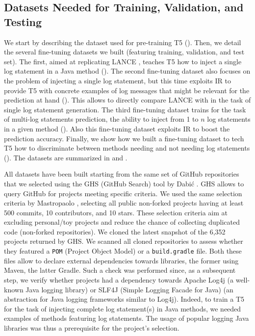 \subsection{Datasets Needed for Training, Validation, and Testing}
\label{sub:datasets}

We start by describing the dataset used for pre-training T5 (). Then, we detail the several fine-tuning datasets we built (featuring training, validation, and test set). The first, aimed at replicating LANCE \cite{mastropaolo2022using}, teaches T5 how to inject a single log statement in a Java method  (). The second fine-tuning dataset also focuses on the problem of injecting a single log statement, but this time exploits IR to provide T5 with concrete examples of log messages that might be relevant for the prediction at hand (). This allows to directly compare LANCE with \approach in the task of single log statement generation. The third fine-tuning dataset trains \approach for the task of multi-log statements prediction, \ie the ability to inject from 1 to $n$ log statements in a given method (). Also this fine-tuning dataset exploits IR to boost the prediction accuracy. Finally, we show how we built a fine-tuning dataset to tech T5 how to discriminate between methods needing and not needing log statements (). The datasets are summarized in  and .



All datasets have been built starting from the same set of GitHub repositories that we selected using the GHS (GitHub Search) tool by Dabi\'c \etal \cite{dabic2021sampling}. GHS allows to query GitHub for projects meeting specific criteria. We used the same selection criteria by Mastropaolo \etal \cite{mastropaolo2022using}, selecting all public non-forked \java projects having at least 500 commits, 10 contributors, and 10 stars. These selection criteria aim at excluding personal/toy projects and reduce the chance of collecting duplicated code (non-forked repositories). We cloned the latest snapshot of the 6,352 projects returned by GHS. We scanned all cloned repositories to assess whether they featured a \texttt{POM} (Project Object Model) or a \texttt{build.gradle} file. Both these files allow to declare external dependencies towards libraries, the former using Maven, the latter Gradle. Such a check was performed since, as a subsequent step, we verify whether projects had a dependency towards Apache Log4j \cite{log4j} (\ie a well-known Java logging library) or SLF4J (Simple Logging Facade for Java) \cite{slf4j} (\ie an abstraction for Java logging frameworks similar to Log4j). Indeed, to train a T5 for the task of injecting complete log statement(s) in Java methods, we needed examples of methods featuring log statements. The usage of popular logging Java libraries was thus a prerequisite for the project's selection.

